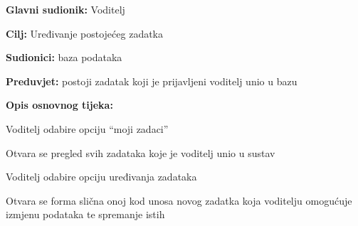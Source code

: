 					\noindent {}
					\begin{packed_item}
						
						\item \textbf{Glavni sudionik: }Voditelj
						\item \textbf{Cilj:} Uređivanje postojećeg zadatka
						\item \textbf{Sudionici:} baza podataka
						\item \textbf{Preduvjet:} postoji zadatak koji je prijavljeni voditelj unio u bazu
						\item \textbf{Opis osnovnog tijeka:}
						
						\item[] \begin{packed_enum}
							\item Voditelj odabire opciju “moji zadaci”
							\item Otvara se pregled svih zadataka koje je voditelj unio u sustav
							\item Voditelj odabire opciju uređivanja zadataka
							\item Otvara se forma slična onoj kod unosa novog zadatka koja voditelju omogućuje izmjenu podataka te spremanje istih
						\end{packed_enum}
					\end{packed_item}
					
					
					
